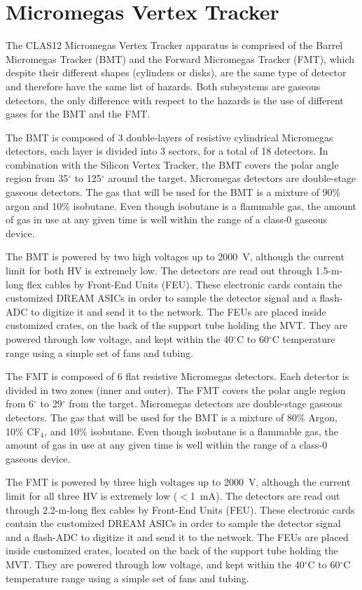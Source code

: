 \section{Micromegas Vertex Tracker}

The CLAS12 Micromegas Vertex Tracker apparatus is comprised of the Barrel Micromegas 
Tracker (BMT) and the Forward Micromegas Tracker (FMT), which despite their different 
shapes (cylinders or disks), are the same type of detector and therefore have the same 
list of hazards. Both subsystems are gaseous detectors, the only difference with respect 
to the hazards is the use of different gases for the BMT and the FMT.

The BMT is composed of 3 double-layers of resistive cylindrical Micromegas detectors, each 
layer is divided into 3 sectors, for a total of 18 detectors. In combination with the 
Silicon Vertex Tracker, the BMT covers the polar angle region from 35$^\circ$ to 125$^\circ$ 
around the target. Micromegas detectors are double-stage gaseous detectors. The gas that will 
be used for the BMT is a mixture of 90\% argon and 10\% isobutane. Even though isobutane 
is a flammable gas, the amount of gas in use at any given time is well within the range of a 
class-0 gaseous device.

The BMT is powered by two high voltages up to 2000~V, although the current limit for both 
HV is extremely low. The detectors are read out through 1.5-m-long flex cables by Front-End 
Units (FEU). These electronic cards contain the customized DREAM ASICs in order to sample the 
detector signal and a flash-ADC to digitize it and send it to the network. The FEUs are placed 
inside customized crates, on the back of the support tube holding the MVT. They are powered 
through low voltage, and kept within the 40$^\circ$C to 60$^\circ$C temperature range using a 
simple set of fans and tubing.

The FMT is composed of 6 flat resistive Micromegas detectors. Each detector is divided in two 
zones (inner and outer). The FMT covers the polar angle region from 6$^\circ$ to 29$^\circ$ 
from the target. Micromegas detectors are double-stage gaseous detectors. The gas that will be 
used for the BMT is a mixture of 80\% Argon, 10\% CF$_4$, and 10\% isobutane. Even though 
isobutane is a flammable gas, the amount of gas in use at any given time is well within the 
range of a class-0 gaseous device.

The FMT is powered by three high voltages up to 2000~V, although the current limit for all 
three HV is extremely low ($<$1~mA). The detectors are read out through 2.2-m-long flex cables 
by Front-End Units (FEU). These electronic cards contain the customized DREAM ASICs in order to 
sample the detector signal and a flash-ADC to digitize it and send it to the network. The FEUs 
are placed inside customized crates, located on the back of the support tube holding the MVT. 
They are powered through low voltage, and kept within the 40$^\circ$C to 60$^\circ$C temperature 
range using a simple set of fans and tubing.

